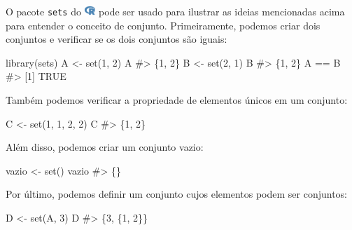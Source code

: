 \documentclass[
  letterpaper,
]{book}
\newenvironment{Shaded}{\begin{snugshade}}{\end{snugshade}}
\newcommand{\CommentTok}[1]{\textcolor[rgb]{0.37,0.37,0.37}{#1}}
\newcommand{\DecValTok}[1]{\textcolor[rgb]{0.68,0.00,0.00}{#1}}
\newcommand{\FunctionTok}[1]{\textcolor[rgb]{0.28,0.35,0.67}{#1}}
\newcommand{\NormalTok}[1]{\textcolor[rgb]{0.00,0.23,0.31}{#1}}
\newcommand{\OtherTok}[1]{\textcolor[rgb]{0.00,0.23,0.31}{#1}}
\newcommand{\SpecialCharTok}[1]{\textcolor[rgb]{0.37,0.37,0.37}{#1}}
\theoremstyle{definition}
\theoremstyle{plain}
\theoremstyle{remark}
\begin{document}
O pacote \texttt{sets} do
\includegraphics[width=1.13em,height=1em]{naive_set_theory_files/figure-pdf/fa-icon-9b00320707d42527dde67262afb33ded.pdf}
pode ser usado para ilustrar as ideias mencionadas acima para entender o
conceito de conjunto. Primeiramente, podemos criar dois conjuntos e
verificar se os dois conjuntos são iguais:

\begin{Shaded}
\begin{Highlighting}[]
\FunctionTok{library}\NormalTok{(sets)}
\NormalTok{A }\OtherTok{\textless{}{-}} \FunctionTok{set}\NormalTok{(}\DecValTok{1}\NormalTok{, }\DecValTok{2}\NormalTok{)}
\NormalTok{A}
\CommentTok{\#\textgreater{} \{1, 2\}}
\NormalTok{B }\OtherTok{\textless{}{-}} \FunctionTok{set}\NormalTok{(}\DecValTok{2}\NormalTok{, }\DecValTok{1}\NormalTok{)}
\NormalTok{B}
\CommentTok{\#\textgreater{} \{1, 2\}}
\NormalTok{A }\SpecialCharTok{==}\NormalTok{ B}
\CommentTok{\#\textgreater{} [1] TRUE}
\end{Highlighting}
\end{Shaded}

Também podemos verificar a propriedade de elementos únicos em um
conjunto:

\begin{Shaded}
\begin{Highlighting}[]
\NormalTok{C }\OtherTok{\textless{}{-}} \FunctionTok{set}\NormalTok{(}\DecValTok{1}\NormalTok{, }\DecValTok{1}\NormalTok{, }\DecValTok{2}\NormalTok{, }\DecValTok{2}\NormalTok{)}
\NormalTok{C}
\CommentTok{\#\textgreater{} \{1, 2\}}
\end{Highlighting}
\end{Shaded}

Além disso, podemos criar um conjunto vazio:

\begin{Shaded}
\begin{Highlighting}[]
\NormalTok{vazio }\OtherTok{\textless{}{-}} \FunctionTok{set}\NormalTok{()}
\NormalTok{vazio}
\CommentTok{\#\textgreater{} \{\}}
\end{Highlighting}
\end{Shaded}

Por último, podemos definir um conjunto cujos elementos podem ser
conjuntos:

\begin{Shaded}
\begin{Highlighting}[]
\NormalTok{D }\OtherTok{\textless{}{-}} \FunctionTok{set}\NormalTok{(A, }\DecValTok{3}\NormalTok{)}
\NormalTok{D}
\CommentTok{\#\textgreater{} \{3, \{1, 2\}\}}
\end{Highlighting}
\end{Shaded}
\end{document}

